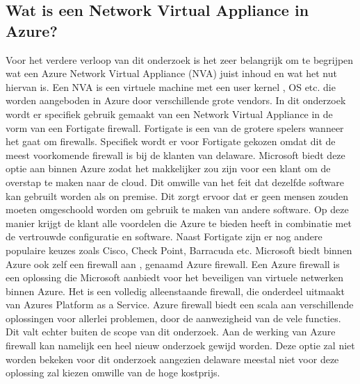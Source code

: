 \subsection{Wat is een Network Virtual Appliance in Azure?}
Voor het verdere verloop van dit onderzoek is het zeer belangrijk om te begrijpen wat een Azure Network Virtual Appliance (NVA) juist inhoud en wat het nut hiervan is. Een NVA is een virtuele machine met een user kernel , OS etc. die worden aangeboden in Azure door verschillende grote vendors. In dit onderzoek wordt er specifiek gebruik gemaakt van een Network Virtual Appliance in de vorm van een Fortigate firewall. Fortigate is een van de grotere spelers wanneer het gaat om firewalls. Specifiek wordt er voor Fortigate gekozen omdat dit de meest voorkomende firewall is bij de klanten van delaware. Microsoft biedt deze optie aan binnen Azure zodat het makkelijker zou zijn voor een klant om de overstap te maken naar de cloud. Dit omwille van het feit dat dezelfde software kan gebruilt worden als on premise. Dit zorgt ervoor dat er geen mensen zouden moeten omgeschoold worden om gebruik te maken van andere software. Op deze manier krijgt de klant alle voordelen die Azure te bieden heeft in combinatie met de vertrouwde configuratie en software. Naast Fortigate zijn er nog andere populaire keuzes zoals Cisco, Check Point, Barracuda etc. \autocite{MicrosoftNVA} 
Microsoft biedt binnen Azure ook zelf een firewall aan , genaamd Azure firewall. Een Azure firewall is een oplossing die Microsoft aanbiedt voor het beveiligen van virtuele netwerken binnen Azure. \autocite{Cooke} Het is een volledig alleenstaande firewall, die onderdeel uitmaakt van Azures Platform as a Service. \newline \autocite{Seferlis2018} Azure firewall biedt een scala aan verschillende oplossingen voor allerlei problemen, door de aanwezigheid van de vele functies. Dit valt echter buiten de scope van dit onderzoek. Aan de werking van Azure firewall kan namelijk een heel nieuw onderzoek gewijd worden. Deze optie zal niet worden bekeken voor dit onderzoek aangezien delaware meestal niet voor deze oplossing zal kiezen omwille van de hoge kostprijs. 

